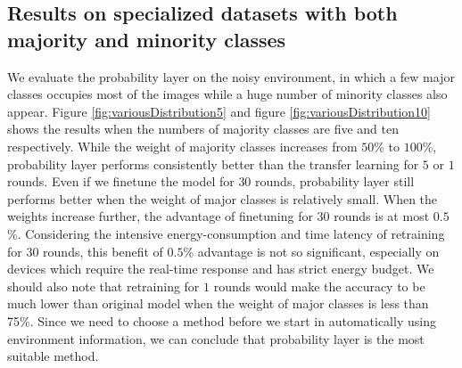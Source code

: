 \documentclass[pageno]{jpaper}
\begin{document}
\subsection{Results on specialized datasets with both majority and minority classes}
We evaluate the probability layer on the noisy environment, in which a few major classes occupies most of the images while a huge number of minority classes also appear. Figure \ref{fig:variousDistribution5} and figure \ref{fig:variousDistribution10} shows the results when the numbers of majority classes are five and ten respectively. While the weight of majority classes increases from $50$\% to $100$\%, probability layer performs consistently better than the transfer learning for $5$ or $1$ rounds. Even if we finetune the model for $30$ rounds, probability layer still performs better when the weight of major classes is relatively small. When the weights increase further, the advantage of finetuning for $30$ rounds is at most $0.5$\%. Considering the intensive energy-consumption and time latency of retraining for $30$ rounds, this benefit of $0.5$\% advantage is not so significant, especially on devices which require the real-time response and has strict energy budget. We should also note that retraining for $1$ rounds would make the accuracy to be much lower than original model when the weight of major classes is less than 75\%. Since we need to choose a method before we start in automatically using environment information, we can conclude that probability layer is the most suitable method.
\end{document}

